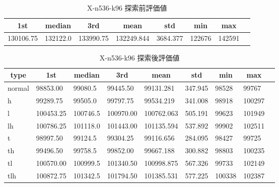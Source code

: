 \begin{table}[htbp]
    \caption{X-n536-k96 探索前評価値}
    \begin{tabular}{|l|l|l|l|l|l|l|l|}\hline
    \multicolumn{1}{|c|}{\textbf{1st}}
    &\multicolumn{1}{c|}{\textbf{median}}
    &\multicolumn{1}{c|}{\textbf{3rd}}
    &\multicolumn{1}{c|}{\textbf{mean}}
    &\multicolumn{1}{c|}{\textbf{std}}
    &\multicolumn{1}{c|}{\textbf{min}}
    &\multicolumn{1}{c|}{\textbf{max}}\\\hline
	130106.75 & 132122.0 & 133990.75 & 132249.844 & 3684.377 & 122676 & 142591\\\hline
	\end{tabular}
\end{table}
\begin{table}[htbp]
    \caption{X-n536-k96 探索後評価値}
    \begin{tabular}{|l|l|l|l|l|l|l|l|l|}\hline
    \multicolumn{1}{|c|}{\textbf{type}}
    &\multicolumn{1}{|c|}{\textbf{1st}}
    &\multicolumn{1}{c|}{\textbf{median}}
    &\multicolumn{1}{c|}{\textbf{3rd}}
    &\multicolumn{1}{c|}{\textbf{mean}}
    &\multicolumn{1}{c|}{\textbf{std}}
    &\multicolumn{1}{c|}{\textbf{min}}
    &\multicolumn{1}{c|}{\textbf{max}}\\\hline
	normal & 98853.00 & 99080.5 & 99445.50 & 99131.281 & 347.945 & 98528 & 99767\\\hline
	h & 99289.75 & 99505.0 & 99797.75 & 99534.219 & 341.008 & 98918 & 100297\\\hline
	l & 100453.25 & 100746.5 & 100970.00 & 100762.063 & 505.191 & 99623 & 101949\\\hline
	lh & 100786.25 & 101118.0 & 101443.00 & 101135.594 & 537.892 & 99902 & 102511\\\hline
	t & 98997.50 & 99124.5 & 99304.25 & 99116.656 & 284.095 & 98427 & 99725\\\hline
	th & 99496.50 & 99758.5 & 99852.00 & 99667.188 & 300.882 & 98803 & 100235\\\hline
	tl & 100570.00 & 100999.5 & 101340.50 & 100998.875 & 567.326 & 99733 & 102149\\\hline
	tlh & 100872.75 & 101342.5 & 101794.50 & 101385.531 & 577.225 & 100338 & 102387\\\hline
	\end{tabular}
\end{table}
